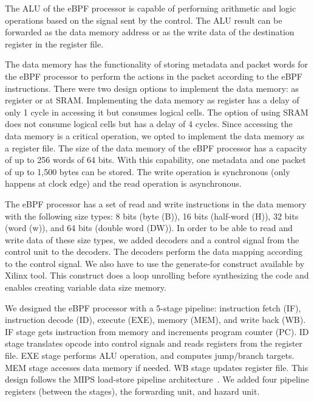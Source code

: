 The ALU of the eBPF processor is capable of performing arithmetic and logic operations based on the signal sent by the control. The ALU result can be forwarded as the data memory address or as the write data of the destination register in the register file.

The data memory has the functionality of storing metadata and packet words for the eBPF processor to perform the actions in the packet according to the eBPF instructions. There were two design options to implement the data memory: as register or at SRAM. Implementing the data memory as register has a delay of only 1 cycle in accessing it but consumes logical cells. The option of using SRAM does not consume logical cells but has a delay of 4 cycles. Since accessing the data memory is a critical operation, we opted to implement the data memory as a register file. The size of the data memory of the eBPF processor has a capacity of up to 256 words of 64 bits. With this capability, one metadata and one packet of up to 1,500 bytes can be stored. 
The write operation is synchronous (only happens at clock edge) and the read operation is asynchronous.

The eBPF processor has a set of read and write instructions in the data memory with the following size types: 8 bits (byte (B)), 16 bits (half-word (H)), 32 bits (word (w)), and 64 bits (double word (DW)). In order to be able to read and write data of these size types, 
we added decoders and a control signal from the control unit to the decoders. The decoders perform the data mapping according to the control signal.
We also have to use the generate-for construct available by Xilinx tool. 
This construct does a loop unrolling before synthesizing the code and enables creating variable data size memory.

We designed the eBPF processor with a 5-stage pipeline: instruction fetch (IF), instruction decode (ID), execute (EXE), memory (MEM), and write back (WB).
IF stage gets instruction from memory and increments program counter (PC).
ID stage translates opcode into control signals and reads registers from the register file. EXE stage performs ALU operation, and computes jump/branch targets. MEM stage accesses data memory if needed. WB stage updates register file. 
This design follows the MIPS load-store pipeline architecture~\cite{Hennessy:2011:CAF:1999263}.
We added four pipeline registers (between the stages), the forwarding unit, and hazard unit. 

